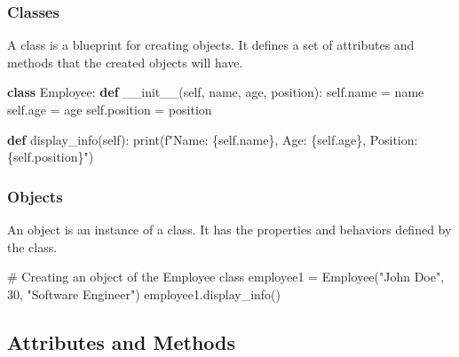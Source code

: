 \documentclass[
  letterpaper,
  DIV=11,
  numbers=noendperiod]{scrreprt}
\newenvironment{Shaded}{\begin{snugshade}}{\end{snugshade}}
\newcommand{\BuiltInTok}[1]{\textcolor[rgb]{0.00,0.23,0.31}{#1}}
\newcommand{\CommentTok}[1]{\textcolor[rgb]{0.37,0.37,0.37}{#1}}
\newcommand{\DecValTok}[1]{\textcolor[rgb]{0.68,0.00,0.00}{#1}}
\newcommand{\FunctionTok}[1]{\textcolor[rgb]{0.28,0.35,0.67}{#1}}
\newcommand{\KeywordTok}[1]{\textcolor[rgb]{0.00,0.23,0.31}{\textbf{#1}}}
\newcommand{\NormalTok}[1]{\textcolor[rgb]{0.00,0.23,0.31}{#1}}
\newcommand{\OperatorTok}[1]{\textcolor[rgb]{0.37,0.37,0.37}{#1}}
\newcommand{\SpecialCharTok}[1]{\textcolor[rgb]{0.37,0.37,0.37}{#1}}
\newcommand{\SpecialStringTok}[1]{\textcolor[rgb]{0.13,0.47,0.30}{#1}}
\newcommand{\StringTok}[1]{\textcolor[rgb]{0.13,0.47,0.30}{#1}}
\newcommand{\VariableTok}[1]{\textcolor[rgb]{0.07,0.07,0.07}{#1}}
\begin{document}
\subsubsection{Classes}\label{classes}

A class is a blueprint for creating objects. It defines a set of
attributes and methods that the created objects will have.

\begin{Shaded}
\begin{Highlighting}[]
\KeywordTok{class}\NormalTok{ Employee:}
    \KeywordTok{def} \FunctionTok{\_\_init\_\_}\NormalTok{(}\VariableTok{self}\NormalTok{, name, age, position):}
        \VariableTok{self}\NormalTok{.name }\OperatorTok{=}\NormalTok{ name}
        \VariableTok{self}\NormalTok{.age }\OperatorTok{=}\NormalTok{ age}
        \VariableTok{self}\NormalTok{.position }\OperatorTok{=}\NormalTok{ position}
    
    \KeywordTok{def}\NormalTok{ display\_info(}\VariableTok{self}\NormalTok{):}
        \BuiltInTok{print}\NormalTok{(}\SpecialStringTok{f"Name: }\SpecialCharTok{\{}\VariableTok{self}\SpecialCharTok{.}\NormalTok{name}\SpecialCharTok{\}}\SpecialStringTok{, Age: }\SpecialCharTok{\{}\VariableTok{self}\SpecialCharTok{.}\NormalTok{age}\SpecialCharTok{\}}\SpecialStringTok{, Position: }\SpecialCharTok{\{}\VariableTok{self}\SpecialCharTok{.}\NormalTok{position}\SpecialCharTok{\}}\SpecialStringTok{"}\NormalTok{)}
\end{Highlighting}
\end{Shaded}

\subsubsection{Objects}\label{objects}

An object is an instance of a class. It has the properties and behaviors
defined by the class.

\begin{Shaded}
\begin{Highlighting}[]
\CommentTok{\# Creating an object of the Employee class}
\NormalTok{employee1 }\OperatorTok{=}\NormalTok{ Employee(}\StringTok{"John Doe"}\NormalTok{, }\DecValTok{30}\NormalTok{, }\StringTok{"Software Engineer"}\NormalTok{)}
\NormalTok{employee1.display\_info()  }
\end{Highlighting}
\end{Shaded}

\subsection{Attributes and Methods}\label{attributes-and-methods}
\end{document}

